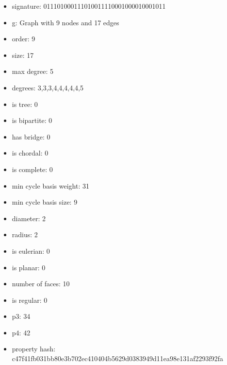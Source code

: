 \newpage
\begin{figure}
\end{figure}
\begin{itemize}
\item signature: 011101000111010011110001000010001011
\item g: Graph with 9 nodes and 17 edges
\item order: 9
\item size: 17
\item max degree: 5
\item degrees: 3,3,3,4,4,4,4,4,5
\item is tree: 0
\item is bipartite: 0
\item has bridge: 0
\item is chordal: 0
\item is complete: 0
\item min cycle basis weight: 31
\item min cycle basis size: 9
\item diameter: 2
\item radius: 2
\item is eulerian: 0
\item is planar: 0
\item number of faces: 10
\item is regular: 0
\item p3: 34
\item p4: 42
\item property hash: c47f41fb031bb80e3b702ec410404b5629d0383949d11ea98e131af2293f92fa
\end{itemize}
